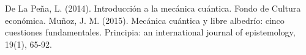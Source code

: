 \documentclass[12pt,a4paper]{article}
\begin{document}
\newpage
\renewcommand{\refname}{Bibliografía}
\begin{thebibliography}{2}
 De La Peña, L. (2014). Introducción a la mecánica cuántica. Fondo de Cultura económica.
 Muñoz, J. M. (2015). Mecánica cuántica y libre albedrío: cinco cuestiones fundamentales. Principia: an international journal of epistemology, 19(1), 65-92.
\end{thebibliography}
\end{document}
